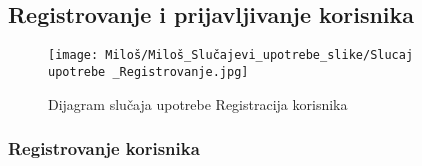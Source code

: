 \documentclass[a4paper]{article}
\begin{document}

\subsection{Registrovanje i prijavljivanje korisnika}

\begin{figure}[htp]
    \centering
    \texttt{[image: Miloš/Miloš\_Slučajevi\_upotrebe\_slike/Slucaj upotrebe \_Registrovanje.jpg]}
    \caption{Dijagram slučaja upotrebe Registracija korisnika}
    \label{fig:Registracija}
\end{figure}

\subsubsection{Registrovanje korisnika}
\end{document}
